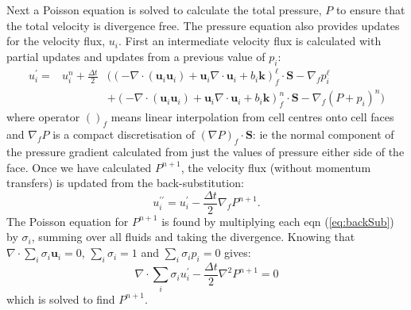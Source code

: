 \documentclass[draft]{agujournal2019}
\begin{document}
Next a Poisson equation is solved to calculate the total pressure,
$P$ to ensure that the total velocity is divergence free.  The pressure
equation also provides updates for the velocity flux, $u_{i}$. First
an intermediate velocity flux is calculated with partial updates and
updates from a previous value of $p_{i}$:
\begin{eqnarray}
u_{i}^{\prime}= & u_{i}^{n}+\frac{\Delta t}{2} & \biggl(\left(-\nabla\cdot(\mathbf{u}_{i}\mathbf{u}_{i})+\mathbf{u}_{i}\nabla\cdot\mathbf{u}_{i}+b_{i}\mathbf{k}\right)_{f}^{\ell}\cdot\mathbf{S}-\nabla_{f}p_{i}^{\ell}\\
 &  & +\left(-\nabla\cdot(\mathbf{u}_{i}\mathbf{u}_{i})+\mathbf{u}_{i}\nabla\cdot\mathbf{u}_{i}+b_{i}\mathbf{k}\right)_{f}^{n}\cdot\mathbf{S}-\nabla_{f}(P+p_{i})^{n}\biggr)
\end{eqnarray}
where operator $()_{f}$ means linear interpolation from cell centres
onto cell faces and $\nabla_{f}P$ is a compact discretisation of
$(\nabla P)_{f}\cdot\mathbf{S}$: ie the normal component of the pressure
gradient calculated from just the values of pressure either side of
the face. Once we have calculated $P^{n+1}$, the velocity flux (without
momentum transfers) is updated from the back-substitution:
\begin{equation}
u_{i}^{\prime\prime}=u_{i}^{\prime}-\frac{\Delta t}{2}\nabla_{f}P^{n+1}.\label{eq:backSub}
\end{equation}
The Poisson equation for $P^{n+1}$ is found by multiplying each eqn
(\ref{eq:backSub}) by $\sigma_{i}$, summing over all fluids and
taking the divergence. Knowing that $\nabla\cdot\sum_{i}\sigma_{i}\mathbf{u}_{i}=0$,
$\sum_{i}\sigma_{i}=1$ and $\sum_{i}\sigma_{i}p_{i}=0$ gives:
\begin{equation}
\nabla\cdot\sum_{i}\sigma_{i}u_{i}^{\prime}-\frac{\Delta t}{2}\nabla^{2}P^{n+1}=0
\end{equation}
which is solved to find $P^{n+1}$. 
\end{document}
